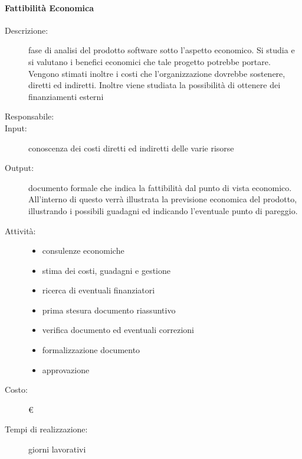 \paragraph{Fattibilità Economica}
\begin{description}
\item[Descrizione:] fase di analisi del prodotto software sotto l'aspetto economico. Si studia
e si valutano i benefici economici che tale progetto potrebbe portare. Vengono stimati
inoltre i costi che l'organizzazione dovrebbe sostenere, diretti ed indiretti. Inoltre viene
studiata la possibilità di ottenere dei finanziamenti esterni 

\item[Responsabile:] 

\item[Input:] conoscenza dei costi diretti ed indiretti delle varie risorse 

\item[Output:] documento formale che indica la fattibilità dal punto di vista economico.
All'interno di questo verrà illustrata la previsione economica del prodotto, illustrando i
possibili guadagni ed indicando l'eventuale punto di pareggio.

\item[Attività:]
\begin{itemize}
\item consulenze economiche
\item stima dei costi, guadagni e gestione
\item ricerca di eventuali finanziatori
\item prima stesura documento riassuntivo
\item verifica documento ed eventuali correzioni
\item formalizzazione documento
\item approvazione
\end{itemize}
\item[Costo:] \euro 
\item[Tempi di realizzazione:]  giorni lavorativi
\end{description}



